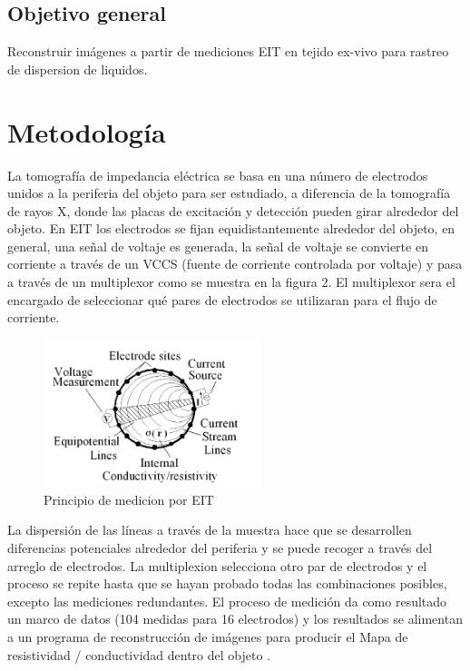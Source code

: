 \documentclass{IEEEtran}
\begin{document}
\subsection{Objetivo general}
Reconstruir imágenes a partir de mediciones EIT en tejido ex-vivo para  rastreo de dispersion de liquidos.

\section{Metodología}
La tomografía de impedancia eléctrica se basa en una número de electrodos unidos a la periferia del objeto para ser estudiado, a diferencia de la tomografía de rayos X, donde las placas de excitación y detección pueden girar alrededor del objeto. En EIT los electrodos se fijan equidistantemente alrededor del objeto, en general, una señal de voltaje es generada, la señal de voltaje se convierte en corriente a través de un VCCS (fuente de corriente controlada por voltaje) y pasa a través de un multiplexor como se muestra en la figura 2. El multiplexor sera el encargado de seleccionar qué pares de electrodos se utilizaran para el flujo de corriente.\\
\begin{figure}[h!]
\centering
\includegraphics[width=2.5in]{imagen1}
\caption{Principio de medicion por EIT}\label{ref:FiguraA}
\end{figure}

La dispersión de las líneas a través de la muestra hace que se desarrollen diferencias potenciales alrededor del
periferia y se puede recoger a través del arreglo de electrodos. La multiplexion selecciona otro par de electrodos y el proceso se repite hasta que se hayan probado todas las combinaciones posibles, excepto las mediciones redundantes. El proceso de medición da como resultado un marco de datos (104
medidas para 16 electrodos) y los resultados se alimentan a un programa de reconstrucción de imágenes para producir el Mapa de resistividad / conductividad dentro del objeto \cite{Gnecchi2010}.\\




\end{document}
